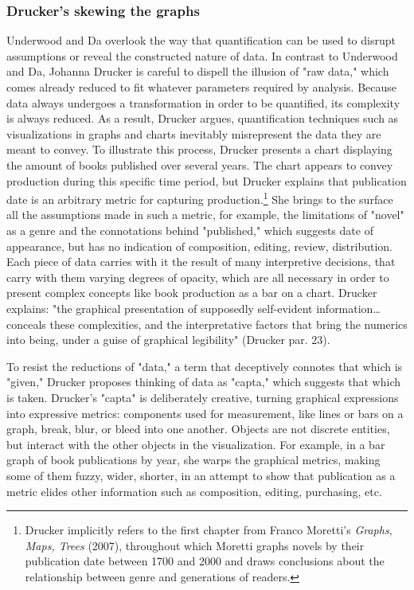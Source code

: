 \documentclass[11pt]{article}
\begin{document}
\subsubsection{Drucker's skewing the graphs}
\label{sec:org246a0d3}

Underwood and Da overlook the way that quantification can be used to
disrupt assumptions or reveal the constructed nature of data. In
contrast to Underwood and Da, Johanna Drucker is careful to dispell
the illusion of "raw data," which comes already reduced to fit
whatever parameters required by analysis. Because data always
undergoes a transformation in order to be quantified, its complexity
is always reduced. As a result, Drucker argues, quantification
techniques such as visualizations in graphs and charts inevitably
misrepresent the data they are meant to convey. To illustrate this
process, Drucker presents a chart displaying the amount of books
published over several years. The chart appears to convey production
during this specific time period, but Drucker explains that
publication date is an arbitrary metric for capturing
production.\footnote{Drucker implicitly refers to the first chapter from Franco
Moretti's \emph{Graphs, Maps, Trees} (2007), throughout which Moretti
graphs novels by their publication date between 1700 and 2000 and
draws conclusions about the relationship between genre and generations
of readers.} She brings to the surface all the assumptions made
in such a metric, for example, the limitations of "novel" as a genre
and the connotations behind "published," which suggests date of
appearance, but has no indication of composition, editing, review,
distribution. Each piece of data carries with it the result of many
interpretive decisions, that carry with them varying degrees of
opacity, which are all necessary in order to present complex concepts
like book production as a bar on a chart. Drucker explains: "the
graphical presentation of supposedly self-evident
information\ldots{} conceals these complexities, and the interpretative
factors that bring the numerics into being, under a guise of graphical
legibility" (Drucker par. 23).

To resist the reductions of "data," a term that deceptively connotes
that which is "given," Drucker proposes thinking of data as "capta,"
which suggests that which is taken. Drucker's "capta" is deliberately
creative, turning graphical expressions into expressive metrics:
components used for measurement, like lines or bars on a graph, break,
blur, or bleed into one another. Objects are not discrete entities,
but interact with the other objects in the visualization. For example,
in a bar graph of book publications by year, she warps the graphical
metrics, making some of them fuzzy, wider, shorter, in an attempt to
show that publication as a metric elides other information such as
composition, editing, purchasing, etc.
\end{document}
